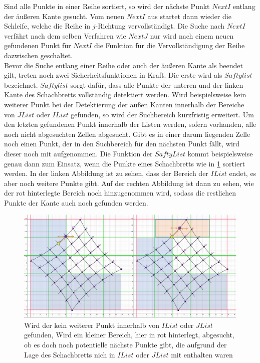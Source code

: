 Sind alle Punkte in einer Reihe sortiert, so wird der nächste Punkt $NextI$ entlang der äußeren Kante gesucht. Vom neuen $NextI$ aus startet dann wieder die Schleife, welche die Reihe in $j$-Richtung vervollständigt. Die Suche nach $NextI$ verfährt nach dem selben Verfahren wie $NextJ$ nur wird nach einem neuen gefundenen Punkt für $NextI$ die Funktion für die Vervollständigung der Reihe dazwischen geschaltet.\\

Bevor die Suche entlang einer Reihe oder auch der äußeren Kante als beendet gilt, treten noch zwei Sicherheitsfunktionen in Kraft. Die erste wird als $Saftylist$ bezeichnet. $Saftylist$ sorgt dafür, dass alle Punkte der unteren und der linken Kante des Schachbretts vollständig detektiert werden. Wird beispielsweise kein weiterer Punkt bei der Detektierung der außen Kanten innerhalb der Bereiche von $JList$ oder $IList$ gefunden, so wird der Suchbereich kurzfristig erweitert. Um den letzten gefundenen Punkt innerhalb der Listen werden, sofern vorhanden, alle noch nicht abgesuchten Zellen abgesucht. Gibt es in einer darum liegenden Zelle noch einen Punkt, der in den Suchbereich für den nächsten Punkt fällt, wird dieser noch mit aufgenommen. Die Funktion der $SaftyList$ kommt beispielsweise genau dann zum Einsatz, wenn die Punkte eines Schachbretts wie in \ref{fig:SaftyList} sortiert werden. In der linken Abbildung ist zu sehen, dass der Bereich der $IList$ endet, es aber noch weitere Punkte gibt. Auf der rechten Abbildung ist dann zu sehen, wie der rot hinterlegte Bereich noch hinzugenommen wird, sodass die restlichen Punkte der Kante auch noch gefunden werden.\\


\begin{figure}[!htb]
	\centering
	\includegraphics[width=0.8\linewidth]{images/VerzeichnetesSchachbrett_6.png}
	\caption[Sicherheitsfunktion $SaftyList$]{Wird der kein weiterer Punkt innerhalb von $IList$ oder $JList$ gefunden, Wird ein kleiner Bereich, hier in rot hinterlegt, abgesucht, ob es doch noch potentielle nächste Punkte gibt, die aufgrund der Lage des Schachbretts nich in $IList$ oder $JList$ mit enthalten waren}
	\label{fig:SaftyList}
\end{figure}


